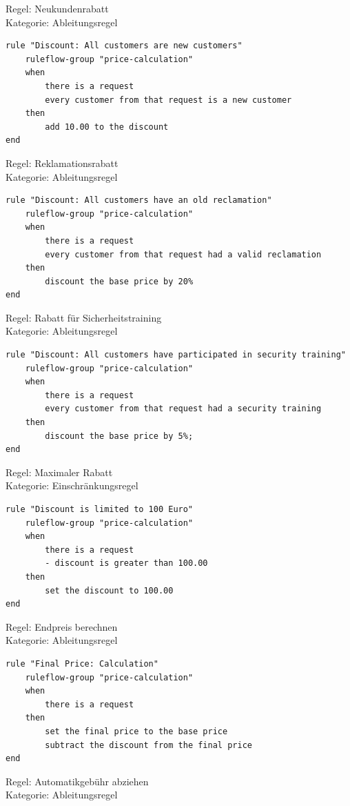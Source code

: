 Regel: Neukundenrabatt \\
Kategorie: Ableitungsregel

\begin{lstlisting}
rule "Discount: All customers are new customers"
	ruleflow-group "price-calculation"
	when
		there is a request
		every customer from that request is a new customer
	then
		add 10.00 to the discount
end
\end{lstlisting}

Regel: Reklamationsrabatt \\
Kategorie: Ableitungsregel

\begin{lstlisting}
rule "Discount: All customers have an old reclamation"
	ruleflow-group "price-calculation"
	when
		there is a request
		every customer from that request had a valid reclamation
	then
		discount the base price by 20%
end
\end{lstlisting}

Regel: Rabatt für Sicherheitstraining \\
Kategorie: Ableitungsregel

\begin{lstlisting}
rule "Discount: All customers have participated in security training"
	ruleflow-group "price-calculation"
	when
		there is a request
		every customer from that request had a security training
	then
		discount the base price by 5%;
end
\end{lstlisting}

Regel: Maximaler Rabatt \\
Kategorie: Einschränkungsregel

\begin{lstlisting}
rule "Discount is limited to 100 Euro"
	ruleflow-group "price-calculation"
	when
		there is a request
		- discount is greater than 100.00
	then
		set the discount to 100.00
end
\end{lstlisting}

Regel: Endpreis berechnen \\
Kategorie: Ableitungsregel

\begin{lstlisting}
rule "Final Price: Calculation"
	ruleflow-group "price-calculation"
	when
		there is a request
	then
		set the final price to the base price
		subtract the discount from the final price
end
\end{lstlisting}

Regel: Automatikgebühr abziehen \\
Kategorie: Ableitungsregel

